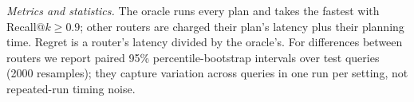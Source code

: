 \emph{Metrics and statistics.} The oracle runs every plan and takes the fastest with Recall@$k\ge0.9$; other routers are charged their plan's latency plus their planning time. Regret is a router's latency divided by the oracle's. For differences between routers we report paired 95\% percentile-bootstrap intervals over test queries (2000 resamples); they capture variation across queries in one run per setting, not repeated-run timing noise.

